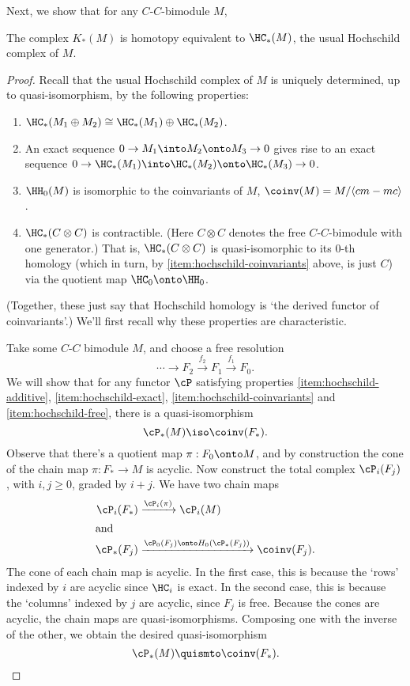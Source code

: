 Next, we show that for any $C$-$C$-bimodule $M$,
\begin{prop} \label{prop:hoch}
The complex $K_*(M)$ is homotopy equivalent to $\HC_*(M)$, the usual
Hochschild complex of $M$.
\end{prop}
\begin{proof}
Recall that the usual Hochschild complex of $M$ is uniquely determined,
up to quasi-isomorphism, by the following properties:
\begin{enumerate}
\item \label{item:hochschild-additive}%
$\HC_*(M_1 \oplus M_2) \cong \HC_*(M_1) \oplus \HC_*(M_2)$.
\item \label{item:hochschild-exact}%
An exact sequence $0 \to M_1 \into M_2 \onto M_3 \to 0$ gives rise to an
exact sequence $0 \to \HC_*(M_1) \into \HC_*(M_2) \onto \HC_*(M_3) \to 0$.
\item \label{item:hochschild-coinvariants}%
$\HH_0(M)$ is isomorphic to the coinvariants of $M$, $\coinv(M) =
M/\langle cm-mc \rangle$.
\item \label{item:hochschild-free}%
$\HC_*(C\otimes C)$ is contractible.
(Here $C\otimes C$ denotes
the free $C$-$C$-bimodule with one generator.)
That is, $\HC_*(C\otimes C)$ is
quasi-isomorphic to its $0$-th homology (which in turn, by \ref{item:hochschild-coinvariants}
above, is just $C$) via the quotient map $\HC_0 \onto \HH_0$.
\end{enumerate}
(Together, these just say that Hochschild homology is `the derived functor of coinvariants'.)
We'll first recall why these properties are characteristic.

Take some $C$-$C$ bimodule $M$, and choose a free resolution
\begin{equation*}
\cdots \to F_2 \xrightarrow{f_2} F_1 \xrightarrow{f_1} F_0.
\end{equation*}
We will show that for any functor $\cP$ satisfying properties
\ref{item:hochschild-additive}, \ref{item:hochschild-exact},
\ref{item:hochschild-coinvariants} and \ref{item:hochschild-free}, there
is a quasi-isomorphism
$$\cP_*(M) \iso \coinv(F_*).$$
%
Observe that there's a quotient map $\pi: F_0 \onto M$, and by
construction the cone of the chain map $\pi: F_* \to M$ is acyclic. Now
construct the total complex $\cP_i(F_j)$, with $i,j \geq 0$, graded by
$i+j$. We have two chain maps
\begin{align*}
\cP_i(F_*) & \xrightarrow{\cP_i(\pi)} \cP_i(M) \\
\intertext{and}
\cP_*(F_j) & \xrightarrow{\cP_0(F_j) \onto H_0(\cP_*(F_j))} \coinv(F_j).
\end{align*}
The cone of each chain map is acyclic. In the first case, this is because the `rows' indexed by $i$ are acyclic since $\HC_i$ is exact.
In the second case, this is because the `columns' indexed by $j$ are acyclic, since $F_j$ is free.
Because the cones are acyclic, the chain maps are quasi-isomorphisms. Composing one with the inverse of the other, we obtain the desired quasi-isomorphism
$$\cP_*(M) \quismto \coinv(F_*).$$


\end{proof}
